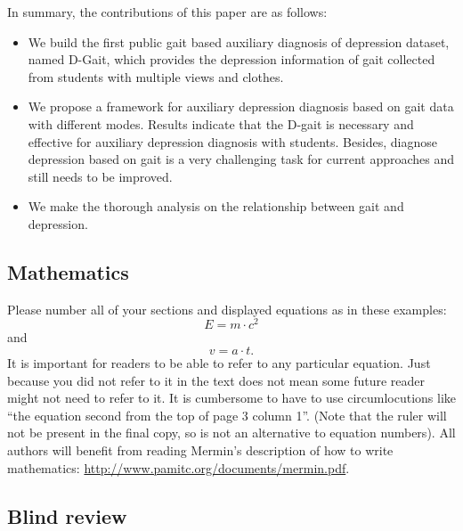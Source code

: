 \documentclass[10pt,twocolumn,letterpaper]{article}
\begin{document}

In summary, the contributions of this paper are as follows:
\begin{itemize}
\item We build the first public gait based auxiliary diagnosis of depression dataset, named D-Gait, which provides the depression information of gait collected from students with multiple views and clothes.

\item We propose a framework for auxiliary depression diagnosis based on gait data with different modes. Results indicate that the D-gait is necessary and effective for auxiliary depression diagnosis with students. Besides, diagnose depression based on gait is a very challenging task for current approaches and still needs to be improved.

\item We make the thorough analysis on the relationship between gait and depression.
\end{itemize}

\subsection{Mathematics}

Please number all of your sections and displayed equations as in these examples:
\begin{equation}
  E = m\cdot c^2
  \label{eq:important}
\end{equation}
and
\begin{equation}
  v = a\cdot t.
  \label{eq:also-important}
\end{equation}
It is important for readers to be able to refer to any particular equation.
Just because you did not refer to it in the text does not mean some future reader might not need to refer to it.
It is cumbersome to have to use circumlocutions like ``the equation second from the top of page 3 column 1''.
(Note that the ruler will not be present in the final copy, so is not an alternative to equation numbers).
All authors will benefit from reading Mermin's description of how to write mathematics:
\url{http://www.pamitc.org/documents/mermin.pdf}.

\subsection{Blind review}
\end{document}
